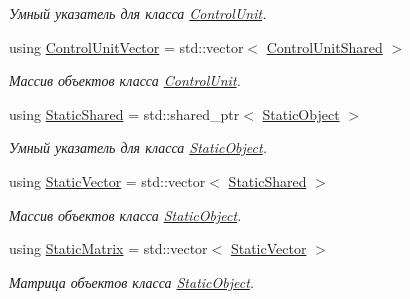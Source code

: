 \begin{DoxyCompactItemize}
\begin{DoxyCompactList}\small\item\em Умный указатель для класса \hyperlink{classrtm_1_1_control_unit}{Control\+Unit}. \end{DoxyCompactList}\item 
\mbox{\label{namespacertm_a4a3a9823e8a845d46e86793bb854caa1}} 
using \hyperlink{namespacertm_a4a3a9823e8a845d46e86793bb854caa1}{Control\+Unit\+Vector} = std\+::vector$<$ \hyperlink{namespacertm_a64296d558b2fa02bbf5870afffd61fd9}{Control\+Unit\+Shared} $>$
\begin{DoxyCompactList}\small\item\em Массив объектов класса \hyperlink{classrtm_1_1_control_unit}{Control\+Unit}. \end{DoxyCompactList}\item 
\mbox{\label{namespacertm_a80e2b49f975d8e515a73b3b579b88e07}} 
using \hyperlink{namespacertm_a80e2b49f975d8e515a73b3b579b88e07}{Static\+Shared} = std\+::shared\+\_\+ptr$<$ \hyperlink{classrtm_1_1_static_object}{Static\+Object} $>$
\begin{DoxyCompactList}\small\item\em Умный указатель для класса \hyperlink{classrtm_1_1_static_object}{Static\+Object}. \end{DoxyCompactList}\item 
\mbox{\label{namespacertm_ab562ef379aa32e4cbfe05536fc842bc3}} 
using \hyperlink{namespacertm_ab562ef379aa32e4cbfe05536fc842bc3}{Static\+Vector} = std\+::vector$<$ \hyperlink{namespacertm_a80e2b49f975d8e515a73b3b579b88e07}{Static\+Shared} $>$
\begin{DoxyCompactList}\small\item\em Массив объектов класса \hyperlink{classrtm_1_1_static_object}{Static\+Object}. \end{DoxyCompactList}\item 
\mbox{\label{namespacertm_ad5f25e2b28cb92f41fe991faa7fcdd30}} 
using \hyperlink{namespacertm_ad5f25e2b28cb92f41fe991faa7fcdd30}{Static\+Matrix} = std\+::vector$<$ \hyperlink{namespacertm_ab562ef379aa32e4cbfe05536fc842bc3}{Static\+Vector} $>$
\begin{DoxyCompactList}\small\item\em Матрица объектов класса \hyperlink{classrtm_1_1_static_object}{Static\+Object}. \end{DoxyCompactList}\item 

\end{DoxyCompactItemize}
